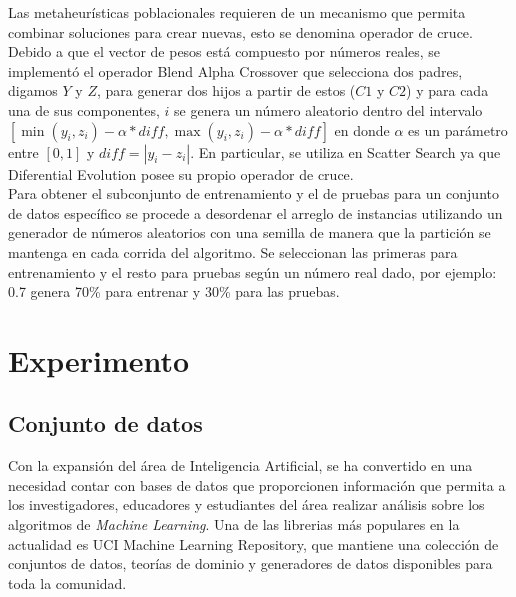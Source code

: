 \documentclass{ci5652}
\begin{document}
Las metaheurísticas poblacionales requieren de un mecanismo que permita combinar soluciones para crear nuevas, esto se denomina operador de cruce. Debido a que el vector de pesos está compuesto por números reales, se implementó el operador Blend Alpha Crossover que selecciona dos padres, digamos $Y$ y $Z$, para generar dos hijos a partir de estos ($C1$ y $C2$) y para cada una de sus componentes, $i$ se genera un número aleatorio dentro del intervalo $[\min(y_i, z_i) - \alpha*diff,\max(y_i, z_i) - \alpha*diff]$ en donde $\alpha$ es un parámetro entre $[0,1]$ y $diff = |y_i - z_i|$. En particular, se utiliza en Scatter Search ya que Diferential Evolution posee su propio operador de cruce.\\

Para obtener el subconjunto de entrenamiento y el de pruebas para un conjunto de datos específico se procede a desordenar el arreglo de instancias utilizando un generador de números aleatorios con una semilla de manera que la partición se mantenga en cada corrida del algoritmo. Se seleccionan las primeras para entrenamiento y el resto para pruebas según un número real dado, por ejemplo: 0.7 genera 70\% para entrenar y 30\% para las pruebas.\\



\section{Experimento}


\subsection{Conjunto de datos}

Con la expansión del área de Inteligencia Artificial, se ha convertido en una
necesidad contar con bases de datos que proporcionen información que permita a
los investigadores, educadores y estudiantes del área realizar análisis sobre
los algoritmos de \textit{Machine Learning}. Una de las librerias más populares
en la actualidad es UCI Machine Learning Repository, que mantiene una colección
de conjuntos de datos, teorías de dominio y generadores de datos disponibles
para toda la comunidad.\\
\end{document}
